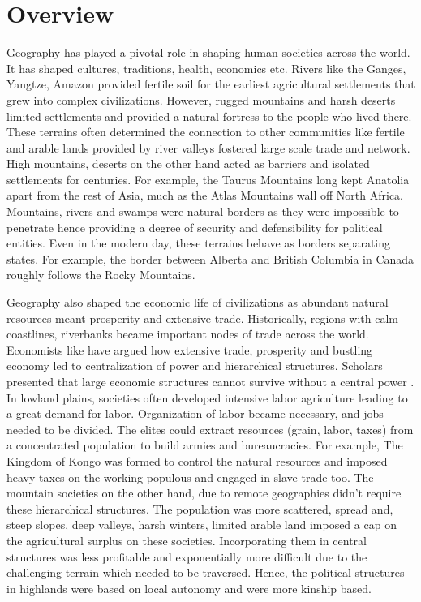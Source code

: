 \begin{sloppypar}

\section{Overview}
Geography has played a pivotal role in shaping human societies across the world. It has shaped cultures, traditions, health, economics etc. Rivers like the Ganges, Yangtze, Amazon provided fertile soil for the earliest agricultural settlements that grew into complex civilizations. However, rugged mountains and harsh deserts limited settlements and provided a natural fortress to the people who lived there. These terrains often determined the connection to other communities like fertile and arable lands provided by river valleys fostered large scale trade and network. High mountains, deserts on the other hand acted as barriers and isolated settlements for centuries. For example, the Taurus Mountains long kept Anatolia apart from the rest of Asia, much as the Atlas Mountains wall off North Africa. Mountains, rivers and swamps were natural borders as they were impossible to penetrate hence providing a degree of security and defensibility for political entities. Even in the modern day, these terrains behave as borders separating states. For example, the border between Alberta and British Columbia in Canada roughly follows the Rocky Mountains. 

\vspace{0.3cm}

Geography also shaped the economic life of civilizations as abundant natural resources meant prosperity and extensive trade. Historically, regions with calm coastlines, riverbanks became important nodes of trade across the world. Economists like \cite{smith1937wealth} have argued how extensive trade, prosperity and bustling economy led to centralization of power and hierarchical structures. Scholars presented that large economic structures cannot survive without a central power \citep{robinson2012nations}. In lowland plains, societies often developed intensive labor agriculture leading to a great demand for labor. Organization of labor became necessary, and jobs needed to be divided. The elites could extract resources (grain, labor, taxes) from a concentrated population to build armies and bureaucracies. For example, The Kingdom of Kongo was formed to control the natural resources and imposed heavy taxes on the working populous and engaged in slave trade too. The mountain societies on the other hand, due to remote geographies didn't require these hierarchical structures. The population was more scattered, spread and,  steep slopes, deep valleys, harsh winters, limited arable land imposed a cap on the agricultural surplus on these societies. Incorporating them in central structures was less profitable and exponentially more difficult due to the challenging terrain which needed to be traversed. Hence, the political structures in highlands were based on local autonomy and were more kinship based.


\end{sloppypar}
